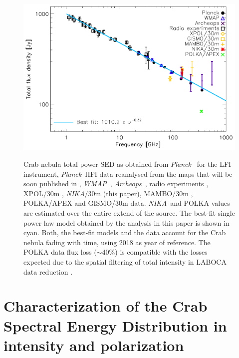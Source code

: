 \documentclass[twocolumn,traditabstract]{aa}
\def\NIKA{\textit{NIKA}}
\def\Archeops{\textit{Archeops}}
\def\Planck{\textit{Planck}}
\def\WMAP{\textit{WMAP}}
\begin{document}
\begin{figure}
  \centering
          { \includegraphics[width=1\linewidth,keepaspectratio]{figures/Crab_SED_int.pdf}}
           \caption{Crab nebula total power SED as obtained from \Planck\ \citep{2015arXiv150702058P} for the LFI instrument, \Planck\ HFI data reanalysed from the maps that will be soon published in \cite{planck2018}, \WMAP\ \citep{2011ApJS..192...19W}, \Archeops\ \citep{macias2007archeops}, radio experiments \citep{dmitrenko1970absolute, 1971IzVUZ..14..157V}, XPOL/30m \citep{aumont2010}, \NIKA/30m (this paper), MAMBO/30m \citep{2002A&A...386.1044B}, POLKA/APEX \citep{2014PASP..126.1027W} and GISMO/30m \citep{2011ApJ...734...54A} data. \NIKA\ and POLKA values are estimated over the entire extend of the source. The best-fit single power law model obtained by the analysis in this paper is shown in cyan. Both, the best-fit models and the data account for the Crab nebula fading with time, using 2018 as year of reference. The POLKA data flux loss ($\sim$40\%) is compatible with the losses expected due to the spatial filtering of total intensity in LABOCA data reduction \citep{2011A&A...527A.145B}.}
\label{crab_SED}		
  \end{figure} 

\section{Characterization of the Crab Spectral Energy Distribution in intensity and polarization}\label{sec:Polarization intensity Spectral Energy Density (SED)}
\end{document}
